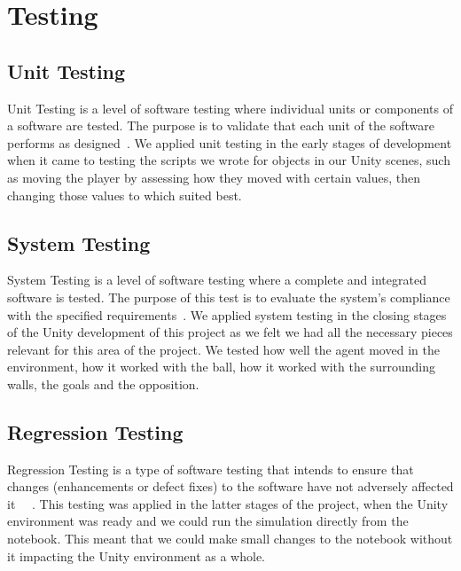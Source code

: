 \section{Testing}
\subsection{Unit Testing}
Unit Testing is a level of software testing where individual units or components of a software are tested. The purpose is to validate that each unit of the software performs as designed~\cite{unitTest}. We applied unit testing in the early stages of development when it came to testing the scripts we wrote for objects in our Unity scenes, such as moving the player by assessing how they moved with certain values, then changing those values to which suited best.

\subsection{System Testing}
System Testing is a level of software testing where a complete and integrated software is tested. The purpose of this test is to evaluate the system’s compliance with the specified requirements~\cite{systemTest}. We applied system testing in the closing stages of the Unity development of this project as we felt we had all the necessary pieces relevant for this area of the project. We tested how well the agent moved in the environment, how it worked with the ball, how it worked with the surrounding walls, the goals and the opposition.

\subsection{Regression Testing}
Regression Testing is a type of software testing that intends to ensure that changes (enhancements or defect fixes) to the software have not adversely affected it~\cite{regressionTest} ~\cite{regressionTesting}. This testing was applied in the latter stages of the project, when the Unity environment was ready and we could run the simulation directly from the notebook. This meant that we could make small changes to the notebook without it impacting the Unity environment as a whole.
